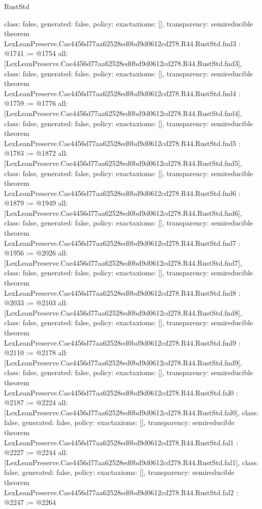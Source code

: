 \begin{lexlean}{RustStd}
\begin{coremodule}
{  class: false,
  generated: false,
  policy: exact{axioms: []},
  transparency: semireducible
}
theorem LexLeanPreserve.Cae4456d77aa62528ed0bd9d0612cd278.R44.RustStd.fnd3 : @1741 := @1754 {
  all: [LexLeanPreserve.Cae4456d77aa62528ed0bd9d0612cd278.R44.RustStd.fnd3],
  class: false,
  generated: false,
  policy: exact{axioms: []},
  transparency: semireducible
}
theorem LexLeanPreserve.Cae4456d77aa62528ed0bd9d0612cd278.R44.RustStd.fnd4 : @1759 := @1776 {
  all: [LexLeanPreserve.Cae4456d77aa62528ed0bd9d0612cd278.R44.RustStd.fnd4],
  class: false,
  generated: false,
  policy: exact{axioms: []},
  transparency: semireducible
}
theorem LexLeanPreserve.Cae4456d77aa62528ed0bd9d0612cd278.R44.RustStd.fnd5 : @1783 := @1872 {
  all: [LexLeanPreserve.Cae4456d77aa62528ed0bd9d0612cd278.R44.RustStd.fnd5],
  class: false,
  generated: false,
  policy: exact{axioms: []},
  transparency: semireducible
}
theorem LexLeanPreserve.Cae4456d77aa62528ed0bd9d0612cd278.R44.RustStd.fnd6 : @1879 := @1949 {
  all: [LexLeanPreserve.Cae4456d77aa62528ed0bd9d0612cd278.R44.RustStd.fnd6],
  class: false,
  generated: false,
  policy: exact{axioms: []},
  transparency: semireducible
}
theorem LexLeanPreserve.Cae4456d77aa62528ed0bd9d0612cd278.R44.RustStd.fnd7 : @1956 := @2026 {
  all: [LexLeanPreserve.Cae4456d77aa62528ed0bd9d0612cd278.R44.RustStd.fnd7],
  class: false,
  generated: false,
  policy: exact{axioms: []},
  transparency: semireducible
}
theorem LexLeanPreserve.Cae4456d77aa62528ed0bd9d0612cd278.R44.RustStd.fnd8 : @2033 := @2103 {
  all: [LexLeanPreserve.Cae4456d77aa62528ed0bd9d0612cd278.R44.RustStd.fnd8],
  class: false,
  generated: false,
  policy: exact{axioms: []},
  transparency: semireducible
}
theorem LexLeanPreserve.Cae4456d77aa62528ed0bd9d0612cd278.R44.RustStd.fnd9 : @2110 := @2178 {
  all: [LexLeanPreserve.Cae4456d77aa62528ed0bd9d0612cd278.R44.RustStd.fnd9],
  class: false,
  generated: false,
  policy: exact{axioms: []},
  transparency: semireducible
}
theorem LexLeanPreserve.Cae4456d77aa62528ed0bd9d0612cd278.R44.RustStd.fal0 : @2187 := @2224 {
  all: [LexLeanPreserve.Cae4456d77aa62528ed0bd9d0612cd278.R44.RustStd.fal0],
  class: false,
  generated: false,
  policy: exact{axioms: []},
  transparency: semireducible
}
theorem LexLeanPreserve.Cae4456d77aa62528ed0bd9d0612cd278.R44.RustStd.fal1 : @2227 := @2244 {
  all: [LexLeanPreserve.Cae4456d77aa62528ed0bd9d0612cd278.R44.RustStd.fal1],
  class: false,
  generated: false,
  policy: exact{axioms: []},
  transparency: semireducible
}
theorem LexLeanPreserve.Cae4456d77aa62528ed0bd9d0612cd278.R44.RustStd.fal2 : @2247 := @2264 {
}
\end{coremodule}
\end{lexlean}
